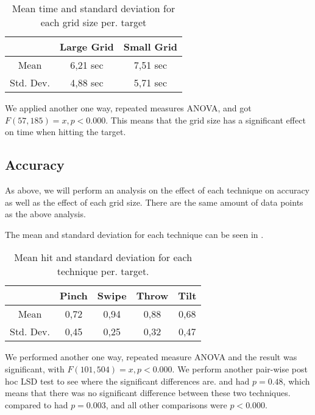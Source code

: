 \begin{table}[H]
	\centering
	\begin{tabular}{|c|c|c|}
		\hline
		\rowcolor[HTML]{9B9B9B} 
		 & \textbf{Large Grid} & \textbf{Small Grid} \\ \hline
		Mean & 6,21 sec & 7,51 sec \\ \hline
		Std. Dev. & 4,88 sec & 5,71 sec \\ \hline
	\end{tabular}
	\caption{Mean time and standard deviation for each grid size per. target}
	\label{tab:meanTimesSize}
\end{table}

We applied another one way, repeated measures ANOVA, and got $F(57,185) = x, p<0.000$. This means that the grid size has a significant effect on time when hitting the target. 

\subsection{Accuracy}

As above, we will perform an analysis on the effect of each technique on accuracy as well as the effect of each grid size. There are the same amount of data points as the above analysis. 

The mean and standard deviation for each technique can be seen in . 

\begin{table}[H]
	\centering
	\begin{tabular}{|c|c|c|c|c|}
			\hline
			\rowcolor[HTML]{9B9B9B} 
			& \textbf{Pinch} & \textbf{Swipe} & \textbf{Throw} & \textbf{Tilt} \\ \hline
			Mean & 0,72         & 0,94          & 0,88          & 0,68         \\ \hline
			Std. Dev. & 0,45 & 0,25 & 0,32 & 0,47 \\ \hline
	\end{tabular}
	\caption{Mean hit  and standard deviation for each technique per. target.}
	\label{tab:meanHitTechnique}
\end{table}

We performed another one way, repeated measure ANOVA and the result was significant, with $F(101,504) = x, p<0.000$. We perform another pair-wise post hoc LSD test to see where the significant differences are. \pinch and \tilt had $p=0.48$, which means that there was no significant difference between these two techniques. \swipe compared to \throw had $p=0.003$, and all other comparisons were $p<0.000$. 

